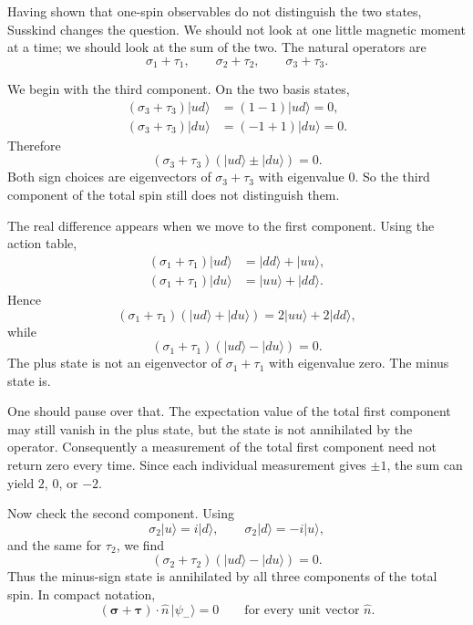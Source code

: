 Having shown that one-spin observables do not distinguish the two states, Susskind changes the question. We should not look at one little magnetic moment at a time; we should look at the sum of the two. The natural operators are
\[
\sigma_1+\tau_1,\qquad
\sigma_2+\tau_2,\qquad
\sigma_3+\tau_3.
\]

We begin with the third component. On the two basis states,
\begin{align}
(\sigma_3+\tau_3)|ud\rangle &= (1-1)|ud\rangle = 0, \\
(\sigma_3+\tau_3)|du\rangle &= (-1+1)|du\rangle = 0.
\end{align}
Therefore
\begin{equation}
(\sigma_3+\tau_3)(|ud\rangle \pm |du\rangle)=0.
\end{equation}
Both sign choices are eigenvectors of \(\sigma_3+\tau_3\) with eigenvalue \(0\). So the third component of the total spin still does not distinguish them.

The real difference appears when we move to the first component. Using the action table,
\begin{align}
(\sigma_1+\tau_1)|ud\rangle &= |dd\rangle + |uu\rangle, \\
(\sigma_1+\tau_1)|du\rangle &= |uu\rangle + |dd\rangle.
\end{align}
Hence
\begin{equation}
(\sigma_1+\tau_1)(|ud\rangle+|du\rangle)
=
2|uu\rangle+2|dd\rangle,
\end{equation}
while
\begin{equation}
(\sigma_1+\tau_1)(|ud\rangle-|du\rangle)=0.
\end{equation}
The plus state is not an eigenvector of \(\sigma_1+\tau_1\) with eigenvalue zero. The minus state is.

One should pause over that. The expectation value of the total first component may still vanish in the plus state, but the state is not annihilated by the operator. Consequently a measurement of the total first component need not return zero every time. Since each individual measurement gives \(\pm 1\), the sum can yield \(2\), \(0\), or \(-2\).

Now check the second component. Using
\[
\sigma_2|u\rangle = i|d\rangle,
\qquad
\sigma_2|d\rangle = -i|u\rangle,
\]
and the same for \(\tau_2\), we find
\begin{equation}
(\sigma_2+\tau_2)(|ud\rangle-|du\rangle)=0.
\end{equation}
Thus the minus-sign state is annihilated by all three components of the total spin. In compact notation,
\begin{equation}
(\boldsymbol{\sigma}+\boldsymbol{\tau})\cdot \hat n\,|\psi_-\rangle = 0
\qquad
\text{for every unit vector }\hat n.
\end{equation}

